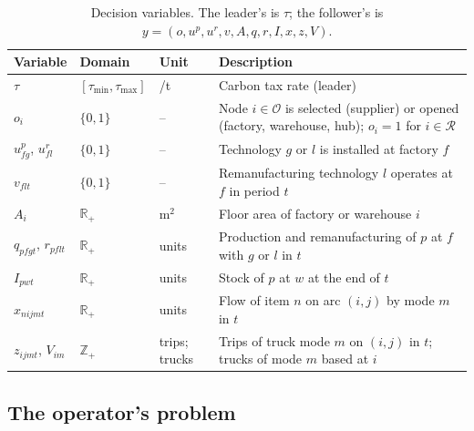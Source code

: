 \documentclass[review,11pt,nonatbib]{elsarticle}
\theoremstyle{remark}
\newcommand{\tmin}{\tau_{\min}}
\newcommand{\tmax}{\tau_{\max}}
\newcommand{\EUR}{\texteuro}
\begin{document}
\begin{table}[!htbp]
\centering
\caption{Decision variables. The leader's is $\tau$; the follower's is $y = (o, u^p, u^r, v, A, q, r, I, x, z, V)$.}\label{tab:variables}
\footnotesize
\begin{tabularx}{\textwidth}{@{}lllL@{}}
\toprule
Variable & Domain & Unit & Description \\
\midrule
$\tau$ & $[\tmin, \tmax]$ & \EUR/t & Carbon tax rate (leader) \\
$o_i$ & $\{0, 1\}$ & -- & Node $i \in \mathcal{O}$ is selected (supplier) or opened (factory, warehouse, hub); $o_i = 1$ for $i \in \mathcal{R}$ \\
$u^p_{fg}$, $u^r_{fl}$ & $\{0, 1\}$ & -- & Technology $g$ or $l$ is installed at factory $f$ \\
$v_{flt}$ & $\{0, 1\}$ & -- & Remanufacturing technology $l$ operates at $f$ in period $t$ \\
$A_i$ & $\mathbb{R}_+$ & m$^2$ & Floor area of factory or warehouse $i$ \\
$q_{pfgt}$, $r_{pflt}$ & $\mathbb{R}_+$ & units & Production and remanufacturing of $p$ at $f$ with $g$ or $l$ in $t$ \\
$I_{pwt}$ & $\mathbb{R}_+$ & units & Stock of $p$ at $w$ at the end of $t$ \\
$x_{nijmt}$ & $\mathbb{R}_+$ & units & Flow of item $n$ on arc $(i,j)$ by mode $m$ in $t$ \\
$z_{ijmt}$, $V_{im}$ & $\mathbb{Z}_+$ & trips; trucks & Trips of truck mode $m$ on $(i,j)$ in $t$; trucks of mode $m$ based at $i$ \\
\bottomrule
\end{tabularx}
\end{table}

\subsection{The operator's problem}\label{sec:follower}
\end{document}

